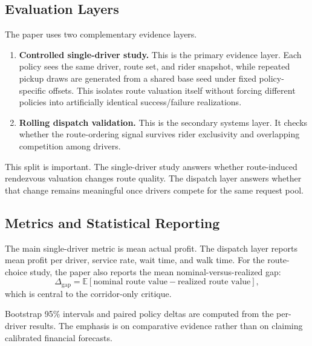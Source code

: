 \documentclass[journal]{IEEEtran}
\begin{document}
\subsection{Evaluation Layers}
The paper uses two complementary evidence layers.
\begin{enumerate}
\item \textbf{Controlled single-driver study.} This is the primary evidence layer. Each policy sees the same driver, route set, and rider snapshot, while repeated pickup draws are generated from a shared base seed under fixed policy-specific offsets. This isolates route valuation itself without forcing different policies into artificially identical success/failure realizations.
\item \textbf{Rolling dispatch validation.} This is the secondary systems layer. It checks whether the route-ordering signal survives rider exclusivity and overlapping competition among drivers.
\end{enumerate}

This split is important. The single-driver study answers whether route-induced rendezvous valuation changes route quality. The dispatch layer answers whether that change remains meaningful once drivers compete for the same request pool.

\subsection{Metrics and Statistical Reporting}
The main single-driver metric is mean actual profit. The dispatch layer reports mean profit per driver, service rate, wait time, and walk time. For the route-choice study, the paper also reports the mean nominal-versus-realized gap:
\begin{equation}
\Delta_{\mathrm{gap}} = \mathbb{E}[\text{nominal route value} - \text{realized route value}],
\end{equation}
which is central to the corridor-only critique.

Bootstrap 95\% intervals and paired policy deltas are computed from the per-driver results. The emphasis is on comparative evidence rather than on claiming calibrated financial forecasts.
\end{document}
